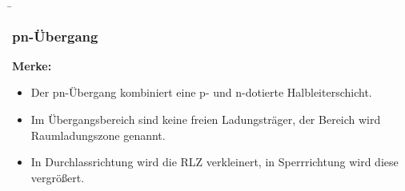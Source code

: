 \begin{frame}
    \b{
    \frametitle{pn-Übergang}
    \textbf{Merke:}
    \begin{itemize}
        \item Der pn-Übergang kombiniert eine p- und n-dotierte Halbleiterschicht.
        \item Im Übergangsbereich sind keine freien Ladungsträger, der Bereich wird Raumladungszone genannt.
        \item In Durchlassrichtung wird die RLZ verkleinert, in Sperrrichtung wird diese vergrößert.  
    \end{itemize}}
\end{frame}
